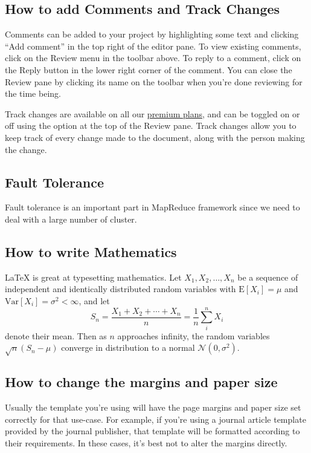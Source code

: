 \documentclass{article}
\begin{document}
\subsection{How to add Comments and Track Changes}

Comments can be added to your project by highlighting some text and clicking ``Add comment'' in the top right of the editor pane. To view existing comments, click on the Review menu in the toolbar above. To reply to a comment, click on the Reply button in the lower right corner of the comment. You can close the Review pane by clicking its name on the toolbar when you're done reviewing for the time being.

Track changes are available on all our \href{https://www.overleaf.com/user/subscription/plans}{premium plans}, and can be toggled on or off using the option at the top of the Review pane. Track changes allow you to keep track of every change made to the document, along with the person making the change. 

\subsection{Fault Tolerance}

Fault tolerance is an important part in MapReduce framework since we need to deal with a large number of cluster. 


\subsection{How to write Mathematics}

\LaTeX{} is great at typesetting mathematics. Let $X_1, X_2, \ldots, X_n$ be a sequence of independent and identically distributed random variables with $\text{E}[X_i] = \mu$ and $\text{Var}[X_i] = \sigma^2 < \infty$, and let
\[S_n = \frac{X_1 + X_2 + \cdots + X_n}{n}
      = \frac{1}{n}\sum_{i}^{n} X_i\]
denote their mean. Then as $n$ approaches infinity, the random variables $\sqrt{n}(S_n - \mu)$ converge in distribution to a normal $\mathcal{N}(0, \sigma^2)$.


\subsection{How to change the margins and paper size}

Usually the template you're using will have the page margins and paper size set correctly for that use-case. For example, if you're using a journal article template provided by the journal publisher, that template will be formatted according to their requirements. In these cases, it's best not to alter the margins directly.
\end{document}
